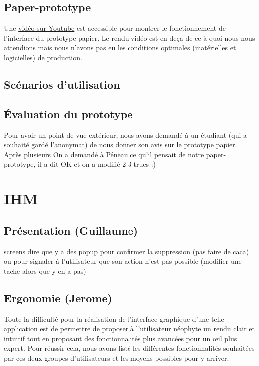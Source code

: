 	\section{Paper-prototype}
	Une \href{https://www.youtube.com/watch?v=xbLaZvgkzjQ}{vidéo sur Youtube} est accessible pour montrer le fonctionnement de l'interface du prototype papier. Le rendu vidéo est en deça de ce à quoi nous nous attendions mais nous n'avons pas eu les conditions optimales (matérielles et logicielles) de production.
	
	
	

	\section{Scénarios d'utilisation}
	
	
	
	\section{Évaluation du prototype}
		Pour avoir un point de vue extérieur, nous avons demandé à un étudiant (qui a souhaité gardé l'anonymat) de nous donner son avis sur le prototype papier. Après plusieurs 
		On a demandé à Péneau ce qu'il pensait de notre paper-prototype, il a dit OK et on a modifié 2-3 trucs :)
		


\chapter{IHM}
	
	\section{Présentation (Guillaume)}
		screens
		dire que y a des popup pour confirmer la suppression (pas faire de caca) ou pour signaler à l'utilisateur que son action n'est pas possible (modifier une tache alors que y en a pas)
	
	\section{Ergonomie (Jerome)}
		Toute la difficulté pour la réalisation de l'interface graphique d'une telle application est de permettre de proposer à l'utilisateur néophyte un rendu clair et intuitif tout en proposant des fonctionnalités plus avancées pour un {\oe}il plus expert. Pour réussir cela, nous avons listé les différentes fonctionnalités souhaitées par ces deux groupes d'utilisateurs et les moyens possibles pour y arriver.
		

